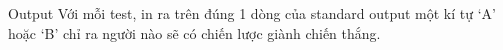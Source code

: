 Output
Với mỗi test, in ra trên đúng 1 dòng của standard output một kí tự ‘A’ hoặc ‘B’ chỉ ra người nào sẽ có chiến lược giành chiến thắng.